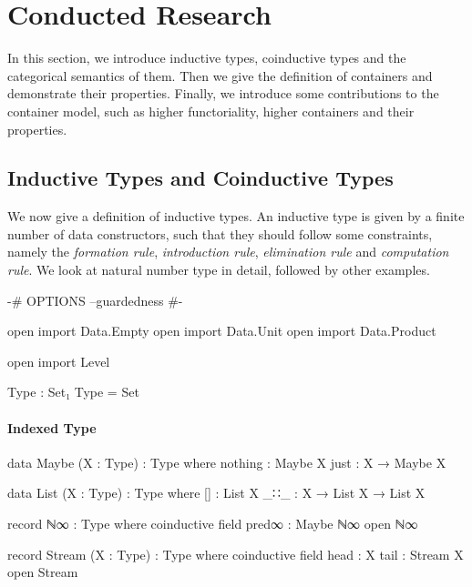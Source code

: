 \chapter{Conducted Research}

In this section, we introduce inductive types, coinductive types and the categorical semantics of them. Then we give the definition of containers and demonstrate their properties. Finally, we introduce some contributions to the container model, such as higher functoriality, higher containers and their properties.

\section{Inductive Types and Coinductive Types}

We now give a definition of inductive types. An inductive type  is given by a finite number of data constructors, such that they should follow some constraints, namely the \textit{formation rule}, \textit{introduction rule}, \textit{elimination rule} and \textit{computation rule}. We look at natural number type in detail, followed by other examples.

\begin{code}[hide]
{-# OPTIONS --guardedness #-}

open import Data.Empty
open import Data.Unit
open import Data.Product

open import Level

Type : Set₁
Type = Set
\end{code}

\subsubsection*{Indexed Type}

\begin{code}
data Maybe (X : Type) : Type where
  nothing : Maybe X
  just    : X → Maybe X
\end{code}

\begin{code}
data List (X : Type) : Type where
  [] : List X
  _∷_ : X → List X → List X
\end{code}

\begin{code}
record ℕ∞ : Type where
  coinductive
  field
    pred∞ : Maybe ℕ∞
open ℕ∞
\end{code}

\begin{code}
record Stream (X : Type) : Type where
  coinductive
  field
    head : X
    tail : Stream X
open Stream
\end{code}


